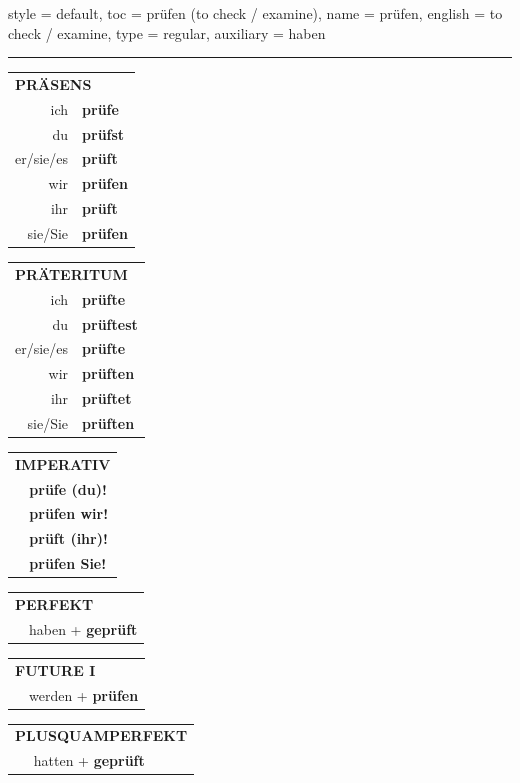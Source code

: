 \begin{verbentry}{
  style = {default},
  toc = {prüfen (to check / examine)},
  name = {prüfen},
  english = {to check / examine},
  type = {regular},
  auxiliary = {haben}
}


\vspace{5pt}
\hrule
\vspace{5pt}

\begin{tabular}{rl}
\multicolumn{2}{l}{\textbf{PRÄSENS}}\\
ich & \textbf{prüfe}\\
du & \textbf{prüfst}\\
er/sie/es & \textbf{prüft}\\
wir & \textbf{prüfen}\\
ihr & \textbf{prüft}\\
sie/Sie & \textbf{prüfen}\\
\end{tabular}
\hfill
\begin{tabular}{rl}
\multicolumn{2}{l}{\textbf{PRÄTERITUM}}\\
ich & \textbf{prüfte}\\
du & \textbf{prüftest}\\
er/sie/es & \textbf{prüfte}\\
wir & \textbf{prüften}\\
ihr & \textbf{prüftet}\\
sie/Sie & \textbf{prüften}\\
\end{tabular}
\hfill
\begin{tabular}{rl}
\multicolumn{2}{l}{\textbf{IMPERATIV}}\\
& \textbf{prüfe (du)!}\\
& \textbf{prüfen wir!}\\
& \textbf{prüft (ihr)!}\\
& \textbf{prüfen Sie!}\\
\end{tabular}

\vspace{10pt}

\begin{tabular}{rl}
\multicolumn{2}{l}{\textbf{PERFEKT}}\\
& haben + \textbf{geprüft}\\
\end{tabular}
\hfill
\begin{tabular}{rl}
\multicolumn{2}{l}{\textbf{FUTURE I}}\\
& werden + \textbf{prüfen}\\
\end{tabular}
\hfill
\begin{tabular}{rl}
\multicolumn{2}{l}{\textbf{PLUSQUAMPERFEKT}}\\
& hatten + \textbf{geprüft}\\
\end{tabular}


\end{verbentry}
